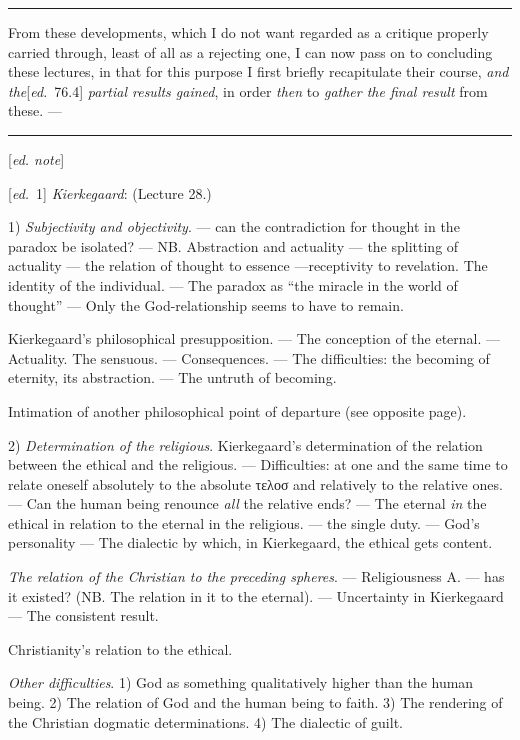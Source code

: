 \documentclass[12pt,a4paper,openany]{book}
\newcommand{\kpage}[1]{\marginnote{\footnotesize\textit{[#1]}}}
\newcommand{\ed}[1]{{\small[\textit{ed.}\ #1]}}
\newcommand{\ednote}[1]{{\small[\textit{ed. note}]}}
\newcommand{\sepline}{\par\begin{center}\rule{2cm}{0.4pt}\end{center}\par}
\begin{document}
\sepline

From these developments, which I do not want regarded as a critique
properly carried through, least of all as a rejecting one, I can now pass
on to concluding these lectures, in that for this purpose I first
briefly recapitulate their course, \emph{and the}\ed{76.4} \emph{partial results gained},
in order \emph{then} to \emph{gather the final result} from these. ---

\sepline

\ednote{}

\ed{1} \emph{Kierkegaard}: (Lecture 28.)

1) \emph{Subjectivity and objectivity}. --- can the contradiction for thought in the paradox be
isolated? --- NB. Abstraction and actuality --- the splitting of actuality
--- the relation of thought to essence ---receptivity to
revelation. The identity of the individual. --- The paradox as ``the miracle in
the world of thought'' --- Only the God-relationship seems to have to remain.

Kierkegaard's philosophical presupposition. --- The conception of
the eternal. --- Actuality. The sensuous. --- Consequences. ---
The difficulties: the becoming of eternity, its abstraction. --- The untruth
of becoming.

Intimation of another philosophical point of departure (see opposite
page).

2) \emph{Determination of the religious}. Kierkegaard's determination of the relation
between the ethical and the religious. --- Difficulties: at one and
the same time to relate oneself absolutely to the absolute τελοσ and relatively to the
relative ones. --- Can the human being renounce \emph{all} the relative ends? --- The
eternal \emph{in} the ethical in relation to the eternal in the religious. --- the
single duty. --- God's personality --- The dialectic by which, in
Kierkegaard, the ethical gets content.

\kpage{177}\emph{The relation of the Christian to the preceding spheres}. --- Religiousness A. --- has
it existed? (NB. The relation in it to the eternal). --- Uncertainty in
Kierkegaard --- The consistent result.

Christianity's relation to the ethical.

\emph{Other difficulties}. 1) God as something qualitatively higher than the human being.
2) The relation of God and the human being to faith. 3) The rendering
of the Christian dogmatic determinations. 4) The dialectic of guilt.
\end{document}
